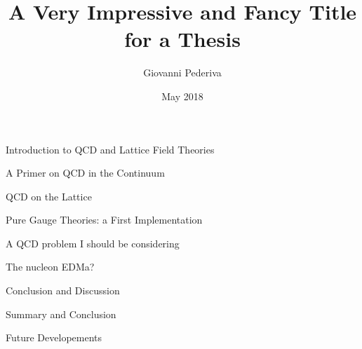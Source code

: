 \documentclass[twoside,english, a4paper, 11pt]{shared/uiofysmaster}
\author{Giovanni Pederiva}
\title{\bf{A Very Impressive and Fancy Title for a Thesis}}
\date{May 2018}
\begin{document}


\maketitle
\clearpage

\tableofcontents
\clearpage

\begin{abstract}
	
\end{abstract}
\begin{acknowledgements}
	
\end{acknowledgements}

\begin{part}{Introduction to QCD and Lattice Field Theories}
	\label{part:intro}
	\begin{chapter}{A Primer on QCD in the Continuum}
		\label{chap:qcd_intro}
  		
	\end{chapter}

	\begin{chapter}{QCD on the Lattice}
		\label{chap:lattice_intro}
	  	
	\end{chapter}

	\begin{chapter}{Pure Gauge Theories: a First Implementation}
		\label{chap:puregauge_intro}
	  	
	\end{chapter}
\end{part}

\begin{part}{A QCD problem I should be considering}
	\begin{chapter}{The nucleon EDMa?}
	\end{chapter}
\end{part}

\begin{part}{Conclusion and Discussion}
	\label{part:conclusion}
	\begin{chapter}{Summary and Conclusion}
		\label{chap:conclusion}
		
	\end{chapter}
	\begin{chapter}{Future Developements}
		\label{chap:future}
		
	\end{chapter}
\end{part}


%		




\end{document}
